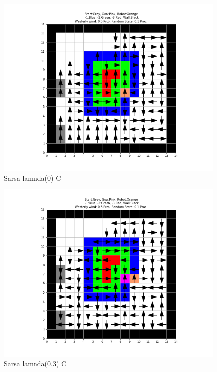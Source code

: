 \documentclass[12pt, letterpaper, twoside]{report}
\begin{document}
  \centering
  \begin{figure}[b]
    \includegraphics[width=\linewidth]{Sarsa_Problem_C_lambda_0.png}
    \caption{Sarsa lamnda(0) C }
  \end{figure}
  \centering
  \begin{figure}[b]
    \includegraphics[width=\linewidth]{Sarsa_Problem_C_lambda_03.png}
    \caption{Sarsa lamnda(0.3) C}
  \end{figure}
  \centering
\end{document}
